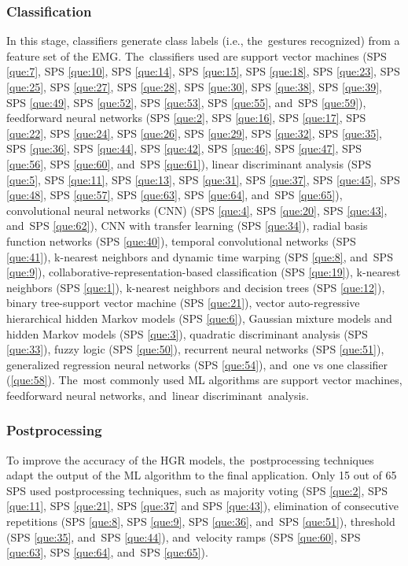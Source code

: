 \documentclass[sensors,review,accept,moreauthors,pdftex]{Definitions/mdpi}
\begin{document}
\subsubsection{Classification} \label{class}
In this stage, classifiers generate class labels (i.e., the~gestures recognized) from a feature set of the EMG. The~classifiers used are support vector machines (SPS \ref{que:7}, SPS \ref{que:10}, SPS \ref{que:14}, SPS \ref{que:15}, SPS \ref{que:18}, SPS \ref{que:23}, SPS \ref{que:25}, SPS \ref{que:27}, SPS \ref{que:28}, SPS \ref{que:30}, SPS \ref{que:38}, SPS \ref{que:39}, SPS \ref{que:49}, SPS \ref{que:52}, SPS \ref{que:53}, SPS \ref{que:55}, and~SPS \ref{que:59}), feedforward neural networks (SPS \ref{que:2}, SPS \ref{que:16}, SPS \ref{que:17}, SPS \ref{que:22}, SPS \ref{que:24}, SPS \ref{que:26}, SPS \ref{que:29}, SPS \ref{que:32}, SPS \ref{que:35}, SPS \ref{que:36}, SPS \ref{que:44}, SPS \ref{que:42}, SPS \ref{que:46}, SPS \ref{que:47}, SPS \ref{que:56}, SPS \ref{que:60}, and~SPS \ref{que:61}), linear discriminant analysis (SPS \ref{que:5}, SPS \ref{que:11}, SPS \ref{que:13}, SPS \ref{que:31}, SPS \ref{que:37}, SPS \ref{que:45}, SPS \ref{que:48}, SPS \ref{que:57}, SPS \ref{que:63}, SPS \ref{que:64}, and~SPS \ref{que:65}), convolutional neural networks (CNN) (SPS \ref{que:4},  SPS \ref{que:20}, SPS \ref{que:43}, and~SPS \ref{que:62}), CNN with transfer learning (SPS \ref{que:34}), radial basis function networks (SPS \ref{que:40}), temporal convolutional networks (SPS \ref{que:41}), k-nearest neighbors and dynamic time warping (SPS \ref{que:8}, and~SPS \ref{que:9}), collaborative-representation-based classification (SPS \ref{que:19}), k-nearest neighbors (SPS \ref{que:1}), k-nearest neighbors and decision trees (SPS \ref{que:12}), binary tree-support vector machine (SPS \ref{que:21}), vector auto-regressive hierarchical hidden Markov models (SPS \ref{que:6}), Gaussian mixture models and hidden Markov models (SPS \ref{que:3}), quadratic discriminant analysis (SPS \ref{que:33}), fuzzy logic (SPS \ref{que:50}), recurrent neural networks (SPS \ref{que:51}), generalized regression neural networks (SPS \ref{que:54}), and~one vs one classifier (\ref{que:58}). The~most commonly used ML algorithms are support vector machines, feedforward neural networks, and~linear discriminant~analysis.  


\subsubsection{Postprocessing} \label{post}
To improve the accuracy of the HGR models, the~postprocessing techniques adapt the output of the ML algorithm to the final application. Only 15 out of 65 SPS used postprocessing techniques, such as majority voting (SPS \ref{que:2}, SPS \ref{que:11}, SPS \ref{que:21}, SPS \ref{que:37} and SPS \ref{que:43}), elimination of consecutive repetitions (SPS \ref{que:8}, SPS \ref{que:9}, SPS \ref{que:36}, and~SPS \ref{que:51}), threshold (SPS \ref{que:35}, and~SPS \ref{que:44}), and~velocity ramps (SPS \ref{que:60}, SPS \ref{que:63}, SPS \ref{que:64}, and~SPS \ref{que:65}). 
\end{document}
